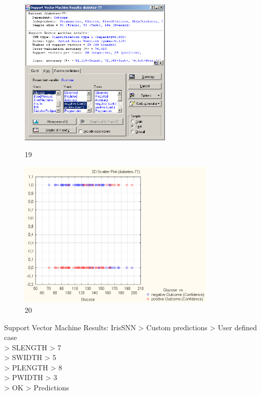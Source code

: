 \begin{figure}[!h]
  \centering

  \begin{minipage}{0.49\textwidth}
    \centering

    \includegraphics[height=7cm]
    {inc/v5_19.PNG}

    \caption{19}

    \label{fig:v5_19}
  \end{minipage}
  \begin{minipage}{0.49\textwidth}
    \centering

    \includegraphics[height=7cm]
    {inc/v5_20.PNG}

    \caption{20}

    \label{fig:v5_20}
  \end{minipage}
\end{figure}

Support Vector Machine Results: IrisSNN > Custom predictions > User defined case \\
> SLENGTH > 7 \\
> SWIDTH > 5 \\
> PLENGTH > 8 \\
> PWIDTH > 3 \\
> OK > Predictions

